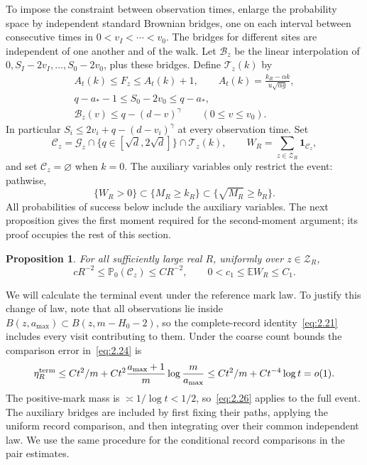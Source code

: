 \documentclass[11pt,a4paper]{article}
\numberwithin{equation}{section}
\newtheorem{proposition}[theorem]{Proposition}
\theoremstyle{remark}
\begin{document}
\label{sec:success}
To impose the constraint between observation times, enlarge the probability space by independent standard Brownian bridges, one on each interval between consecutive times in $0<v_I<\cdots<v_0$. The bridges for different sites are independent of one another and of the walk. Let $\mathcal B_z$ be the linear interpolation of
$0,S_I-2v_I,\ldots,S_0-2v_0$, plus these bridges. Define $\mathcal T_z(k)$ by
\begin{equation}\label{eq:5.10}
\begin{gathered}
A_t(k)\le F_z\le A_t(k)+1,\qquad
A_t(k)=\frac{k_R-\alpha k}{u\sqrt{\alpha g}},\\
q-a_*-1\le S_0-2v_0\le q-a_*,\\
\mathcal B_z(v)\le q-(d-v)^\gamma\qquad(0\le v\le v_0).
\end{gathered}
\end{equation}
In particular $S_i\le2v_i+q-(d-v_i)^\gamma$ at every observation time.
Set
\begin{equation}\label{eq:5.15}
\mathcal C_z=\mathcal G_z\cap\{q\in[\sqrt d,2\sqrt d]\}\cap\mathcal T_z(k),
\qquad W_R=\sum_{z\in\mathscr Z_R}\mathbf1_{\mathcal C_z},
\end{equation}
and set $\mathcal C_z=\varnothing$ when $k=0$. The auxiliary variables only restrict the event: pathwise,
\begin{equation}\label{eq:5.16}
\{W_R>0\}\subset\{M_R\ge k_R\}\subset\{\sqrt{M_R}\ge b_R\}.
\end{equation}
All probabilities of success below include the auxiliary variables. The next proposition gives the first moment required for the second-moment argument; its proof occupies the rest of this section.

\begin{proposition}\label{prop:onepoint}
For all sufficiently large real $R$, uniformly over $z\in\mathscr Z_R$,
\begin{equation}\label{eq:7.28}
cR^{-2}\le\mathbb P_0(\mathcal C_z)\le CR^{-2},\qquad
0<c_1\le\mathbb EW_R\le C_1.
\end{equation}
\end{proposition}

\label{sec:lowercomparison}
We will calculate the terminal event under the reference mark law. To justify this change of law, note that all observations lie inside $B(z,a_{\max})\subset B(z,m-H_0-2)$, so the complete-record identity~\eqref{eq:2.21} includes every visit contributing to them.
Under the coarse count bounds the comparison error in~\eqref{eq:2.24} is
\begin{equation}\label{eq:5.17}
\eta_R^{\rm term}\le Ct^2/m+
Ct^2\frac{a_{\max}+1}{m}\log\frac m{a_{\max}}
\le Ct^2/m+Ct^{-4}\log t=o(1).
\end{equation}
The positive-mark mass is $\asymp1/\log t<1/2$, so~\eqref{eq:2.26}
applies to the full event. The auxiliary bridges are included by first fixing their paths, applying the uniform record comparison, and then integrating over their common independent law. We use the same procedure for the conditional record comparisons in the pair estimates.
\end{document}
